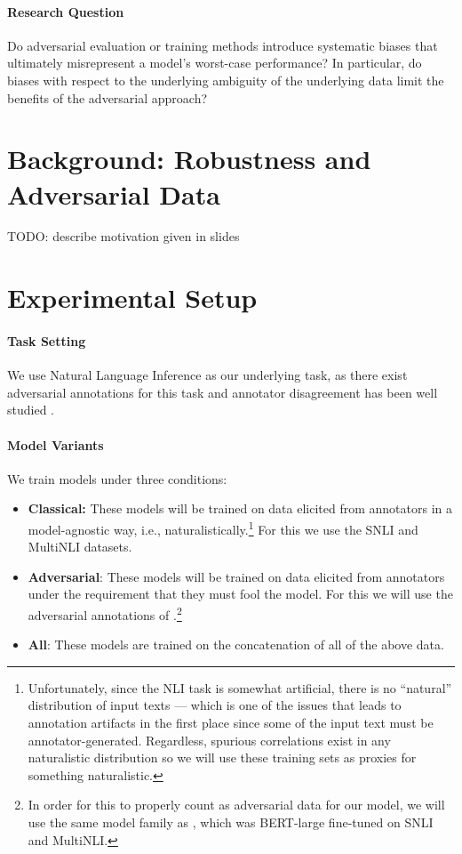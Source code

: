 \documentclass[10pt,a4paper]{article}
\newcommand{\ie}{i.e.}
\begin{document}
\paragraph{Research Question}
Do adversarial evaluation or training methods introduce systematic biases that ultimately
misrepresent a model's worst-case performance? In particular, do biases with respect to the
underlying ambiguity of the underlying data limit the benefits of the adversarial approach?

\section{Background: Robustness and Adversarial Data}

TODO: describe motivation given in slides

\section{Experimental Setup}

\paragraph{Task Setting}
We use Natural Language Inference \citep{dagan2005pascal,bowman2015large} as our underlying task, as there exist adversarial annotations for this task \citep{nie-etal-2020-adversarial,kiela-etal-2021-dynabench} and annotator disagreement has been well studied \citep{pavlick-kwiatkowski-2019-inherent,nie-bansal-2020-learn,zhang-de-marneffe-2021-identifying}.

\paragraph{Model Variants}
We train models under three conditions:
\begin{itemize}
\item \textbf{Classical:} These models will be trained on data elicited from annotators in a model-agnostic way, \ie, naturalistically.\footnote{Unfortunately, since the NLI task is somewhat artificial, there is no ``natural'' distribution of input texts --- which is one of the issues that leads to annotation artifacts in the first place \citep{gururangan2018annotation} since some of the input text must be annotator-generated. Regardless, spurious correlations exist in any naturalistic distribution so we will use these training sets as proxies for something naturalistic.} For this we use the SNLI \citep{bowman2015large} and MultiNLI \citep{williams-etal-2018-broad} datasets.
\item \textbf{Adversarial}: These models will be trained on data elicited from annotators under the requirement that they must fool the model. For this we will use the adversarial annotations of \citet{nie-etal-2020-adversarial}.\footnote{In order for this to properly count as adversarial data for our model, we will use the same model family as \citet{nie-etal-2020-adversarial}, which was BERT-large \citep{devlin2019bert} fine-tuned on SNLI and MultiNLI.}
\item \textbf{All}: These models are trained on the concatenation of all of the above data.
\end{itemize}
\end{document}
